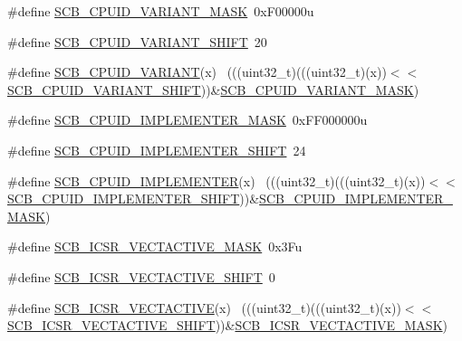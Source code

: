 \begin{DoxyCompactItemize}
\item 
\#define \hyperlink{group___s_c_b___register___masks_ga42f96b8e820835b499d29a04e593d363}{S\+C\+B\+\_\+\+C\+P\+U\+I\+D\+\_\+\+V\+A\+R\+I\+A\+N\+T\+\_\+\+M\+A\+SK}~0x\+F00000u
\item 
\#define \hyperlink{group___s_c_b___register___masks_ga810d19688c9813a71a60087f8ad98b2f}{S\+C\+B\+\_\+\+C\+P\+U\+I\+D\+\_\+\+V\+A\+R\+I\+A\+N\+T\+\_\+\+S\+H\+I\+FT}~20
\item 
\#define \hyperlink{group___s_c_b___register___masks_ga5893cc47868f7ce5410fc210cb28e56f}{S\+C\+B\+\_\+\+C\+P\+U\+I\+D\+\_\+\+V\+A\+R\+I\+A\+NT}(x)                                      ~(((uint32\+\_\+t)(((uint32\+\_\+t)(x))$<$$<$\hyperlink{group___s_c_b___register___masks_ga810d19688c9813a71a60087f8ad98b2f}{S\+C\+B\+\_\+\+C\+P\+U\+I\+D\+\_\+\+V\+A\+R\+I\+A\+N\+T\+\_\+\+S\+H\+I\+FT}))\&\hyperlink{group___s_c_b___register___masks_ga42f96b8e820835b499d29a04e593d363}{S\+C\+B\+\_\+\+C\+P\+U\+I\+D\+\_\+\+V\+A\+R\+I\+A\+N\+T\+\_\+\+M\+A\+SK})
\item 
\#define \hyperlink{group___s_c_b___register___masks_gab1f83660e1dfa68aeccfed5a890725a9}{S\+C\+B\+\_\+\+C\+P\+U\+I\+D\+\_\+\+I\+M\+P\+L\+E\+M\+E\+N\+T\+E\+R\+\_\+\+M\+A\+SK}~0x\+F\+F000000u
\item 
\#define \hyperlink{group___s_c_b___register___masks_ga6729af9d9ed3840dae99f10bb2feb44d}{S\+C\+B\+\_\+\+C\+P\+U\+I\+D\+\_\+\+I\+M\+P\+L\+E\+M\+E\+N\+T\+E\+R\+\_\+\+S\+H\+I\+FT}~24
\item 
\#define \hyperlink{group___s_c_b___register___masks_gab0fb7e28b04f21790b271cc997368c35}{S\+C\+B\+\_\+\+C\+P\+U\+I\+D\+\_\+\+I\+M\+P\+L\+E\+M\+E\+N\+T\+ER}(x)                              ~(((uint32\+\_\+t)(((uint32\+\_\+t)(x))$<$$<$\hyperlink{group___s_c_b___register___masks_ga6729af9d9ed3840dae99f10bb2feb44d}{S\+C\+B\+\_\+\+C\+P\+U\+I\+D\+\_\+\+I\+M\+P\+L\+E\+M\+E\+N\+T\+E\+R\+\_\+\+S\+H\+I\+FT}))\&\hyperlink{group___s_c_b___register___masks_gab1f83660e1dfa68aeccfed5a890725a9}{S\+C\+B\+\_\+\+C\+P\+U\+I\+D\+\_\+\+I\+M\+P\+L\+E\+M\+E\+N\+T\+E\+R\+\_\+\+M\+A\+SK})
\item 
\#define \hyperlink{group___s_c_b___register___masks_ga5818ac6e0642a5053dd525d82623054b}{S\+C\+B\+\_\+\+I\+C\+S\+R\+\_\+\+V\+E\+C\+T\+A\+C\+T\+I\+V\+E\+\_\+\+M\+A\+SK}~0x3\+Fu
\item 
\#define \hyperlink{group___s_c_b___register___masks_ga02696369c8528292cf4f41897d83b156}{S\+C\+B\+\_\+\+I\+C\+S\+R\+\_\+\+V\+E\+C\+T\+A\+C\+T\+I\+V\+E\+\_\+\+S\+H\+I\+FT}~0
\item 
\#define \hyperlink{group___s_c_b___register___masks_gacb9e76e7fa9000878ba2be80556f2013}{S\+C\+B\+\_\+\+I\+C\+S\+R\+\_\+\+V\+E\+C\+T\+A\+C\+T\+I\+VE}(x)                                  ~(((uint32\+\_\+t)(((uint32\+\_\+t)(x))$<$$<$\hyperlink{group___s_c_b___register___masks_ga02696369c8528292cf4f41897d83b156}{S\+C\+B\+\_\+\+I\+C\+S\+R\+\_\+\+V\+E\+C\+T\+A\+C\+T\+I\+V\+E\+\_\+\+S\+H\+I\+FT}))\&\hyperlink{group___s_c_b___register___masks_ga5818ac6e0642a5053dd525d82623054b}{S\+C\+B\+\_\+\+I\+C\+S\+R\+\_\+\+V\+E\+C\+T\+A\+C\+T\+I\+V\+E\+\_\+\+M\+A\+SK})
$$
\end{DoxyCompactItemize}
